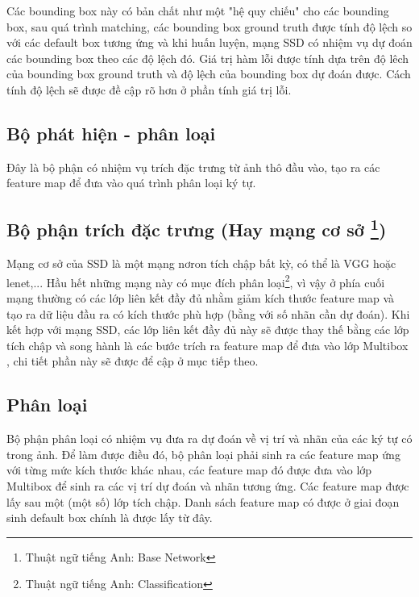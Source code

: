 \documentclass[a4paper]{article}
\theoremstyle{definition}
\begin{document}
	Các bounding box này có bản chất như một "hệ quy chiếu" cho các bounding box, sau quá trình matching, các bounding box ground truth được tính độ lệch so với các default box tương ứng và khi huấn luyện, mạng SSD\cite{liu2016ssd} có nhiệm vụ dự đoán các bounding box theo các độ lệch đó. Giá trị hàm lỗi được tính dựa trên độ lêch của bounding box ground truth và độ lệch của bounding box dự đoán được. Cách tính độ lệch sẽ được đề cập rõ hơn ở phần tính giá trị lỗi.
	
	
	\subsection{Bộ phát hiện - phân loại}
	Đây là bộ phận có nhiệm vụ trích đặc trưng từ ảnh thô đầu vào, tạo ra các feature map để đưa vào quá trình phân loại ký tự.
	
	\subsection*{Bộ phận trích đặc trưng (Hay mạng cơ sở \footnote{Thuật ngữ tiếng Anh: Base Network})}
	
	Mạng cơ sở của SSD\cite{liu2016ssd} là một mạng nơron tích chập bất kỳ, có thể là VGG\cite{Simonyan14c} hoặc lenet\cite{yanlecun},... Hầu hết những mạng này có mục đích phân loại\footnote{Thuật ngữ tiếng Anh: Classification}, vì vậy ở phía cuối mạng thường có các lớp liên kết đầy đủ nhằm giảm kích thước feature map và tạo ra dữ liệu đầu ra có kích thước phù hợp (bằng với số nhãn cần dự đoán). Khi kết hợp với mạng SSD\cite{liu2016ssd}, các lớp liên kết đầy đủ này sẽ được thay thế bằng các lớp tích chập và song hành là các bước trích ra feature map để đưa vào lớp Multibox \cite{erhan2014scalable}, chi tiết phần này sẽ được để cập ở mục tiếp theo.
	
	\subsection* {Phân loại}
	
	Bộ phận phân loại có nhiệm vụ đưa ra dự đoán về vị trí và nhãn của các ký tự có trong ảnh. Để làm được điều đó, bộ phân loại phải sinh ra các feature map ứng với từng mức kích thước khác nhau, các feature map đó được đưa vào lớp Multibox để sinh ra các vị trí dự đoán và nhãn tương ứng. Các feature map được lấy sau một (một số) lớp tích chập. Danh sách feature map có được ở giai đoạn sinh default box chính là được lấy từ đây. \\
	
\end{document}
